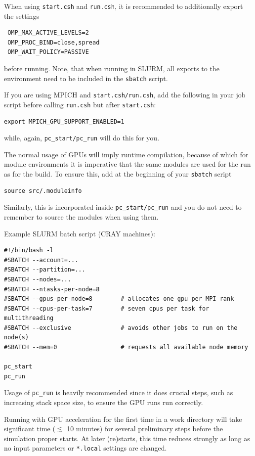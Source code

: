 \documentclass[a4paper,12pt]{article}
\newcommand{\command}[1]{\texttt{#1}}
\newcommand{\code}[1]{\texttt{#1}}
\begin{document}
When using \command{start.csh} and \command{run.csh}, it is recommended to additionally export the settings
\begin{verbatim}
 OMP_MAX_ACTIVE_LEVELS=2
 OMP_PROC_BIND=close,spread
 OMP_WAIT_POLICY=PASSIVE
\end{verbatim}
before running.
Note, that when running in SLURM,
all exports to the environment need to be included in the \code{sbatch} script.

If you are using MPICH and \command{start.csh/run.csh}, add the following in your job script before calling \command{run.csh} but after \command{start.csh}:
\begin{verbatim}
export MPICH_GPU_SUPPORT_ENABLED=1
\end{verbatim}
while, again, \code{pc\_start/pc\_run} will do this for you.

The normal usage of GPUs will imply runtime compilation, 
because of which for module environments it is imperative that the same modules are used for the run as for the build.
To ensure this, add at the beginning of your \code{sbatch} script
\begin{verbatim}
source src/.moduleinfo
\end{verbatim}

Similarly, this is incorporated inside \code{pc\_start/pc\_run} and you do not need to remember to source the modules when using them.


Example SLURM batch script (CRAY machines):
\begin{verbatim}
#!/bin/bash -l
#SBATCH --account=...
#SBATCH --partition=...
#SBATCH --nodes=...
#SBATCH --ntasks-per-node=8
#SBATCH --gpus-per-node=8        # allocates one gpu per MPI rank 
#SBATCH --cpus-per-task=7        # seven cpus per task for multithreading
#SBATCH --exclusive              # avoids other jobs to run on the node(s)
#SBATCH --mem=0                  # requests all available node memory

pc_start
pc_run

\end{verbatim}

Usage of \code{pc\_run} is heavily recommended since it does crucial steps, such as increasing stack space size, to ensure the GPU runs run correctly.

Running with GPU acceleration for the first time in a work directory will take significant time ($\lesssim$ 10 minutes) for several preliminary steps before the simulation proper starts. At later (re)starts, this time reduces strongly as long as no input parameters or \command{*.local} settings are changed.
\end{document}
